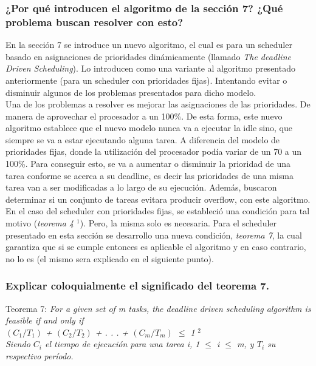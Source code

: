 \documentclass[a4paper]{article}
\begin{document}
\subsubsection{¿Por qu\'e introducen el algoritmo de la secci\'on 7? ¿Qu\'e problema buscan resolver con esto?}
En la sección 7 se introduce un nuevo algoritmo, el cual es para un scheduler basado en asignaciones de prioridades dinámicamente (llamado \textit{The deadline Driven Scheduling}). Lo introducen como una variante al algoritmo presentado anteriormente (para un scheduler con prioridades fijas). Intentando evitar o disminuir algunos de los problemas presentados para dicho modelo. \\

Una de los problemas a resolver es mejorar las asignaciones de las prioridades. De manera de aprovechar el procesador a un 100\%. De esta forma, este nuevo algoritmo establece que el nuevo modelo nunca va a ejecutar la idle sino, que siempre se va a estar ejecutando alguna tarea. A diferencia del modelo de prioridades fijas, donde la utilización del procesador podía variar de un 70 a un 100\%. Para conseguir esto, se va a aumentar o disminuir la prioridad de una tarea conforme se acerca a su deadline, es decir las prioridades de una misma tarea van a ser modificadas a lo largo de su ejecución. Además, buscaron determinar si un conjunto de tareas evitara producir overflow, con este algoritmo. En el caso del scheduler con prioridades fijas, se estableció una condición para tal motivo (\textit{teorema 4 $^1$}). Pero, la misma solo es necesaria. Para el scheduler presentado en esta sección se desarrollo una nueva condición, \textit{teorema 7}, la cual garantiza que si se cumple entonces es aplicable el algoritmo y en caso contrario, no lo es (el mismo sera explicado en el siguiente punto). 
  
\subsubsection{Explicar coloquialmente el significado del teorema 7.}

Teorema 7:
\textit {For a given set of m tasks, the deadline driven scheduling algorithm
is feasible if and only if }\\
 
 \textit {$(C_1/T_1)$ + $(C_2/T_2)$ + . . . + $(C_m/T_m)$ $\leq$ 1 } $^2$\\

\textit{Siendo $C_i$ el tiempo de ejecuci\'on para una tarea i, 1 $\leq$ i $\leq$ m, y $T_i$ su respectivo per\'iodo.}
\end{document}
